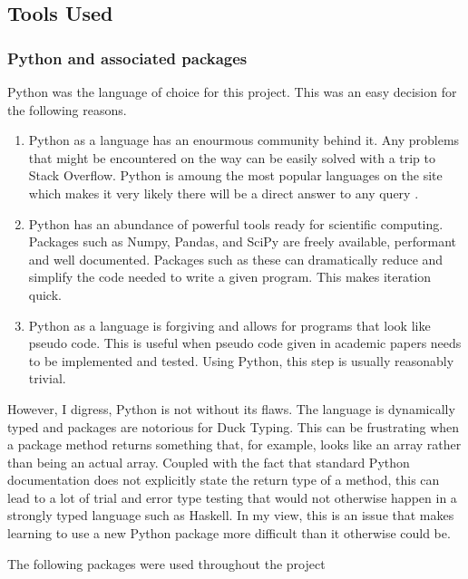 \documentclass{report}
\begin{document}
\subsection{Tools Used}
\subsubsection{Python and associated packages}

Python was the language of choice for this project. This was an easy decision for the following reasons.

\begin{enumerate}
  \item Python as a language has an enourmous community behind it. Any problems that might be encountered on the way can be easily solved with a trip to Stack Overflow. Python is amoung the most popular languages on the site which makes it very likely there will be a direct answer to any query \cite{website:redmonk-languages}. 
  
  \item Python has an abundance of powerful tools ready for scientific computing. Packages such as Numpy, Pandas, and SciPy are freely available, performant and well documented. Packages such as these can dramatically reduce and simplify the code needed to write a given program. This makes iteration quick.

  \item Python as a language is forgiving and allows for programs that look like pseudo code. This is useful when pseudo code given in academic papers needs to be implemented and tested. Using Python, this step is usually reasonably trivial.

\end{enumerate}


However, I digress, Python is not without its flaws. The language is dynamically typed and packages are notorious for Duck Typing. This can be frustrating when a package method returns something that, for example, looks like an array rather than being an actual array. Coupled with the fact that standard Python documentation does not explicitly state the return type of a method, this can lead to a lot of trial and error type testing that would not otherwise happen in a strongly typed language such as Haskell. In my view, this is an issue that makes learning to use a new Python package more difficult than it otherwise could be.\newline


\noindent The following packages were used throughout the project
\end{document}
